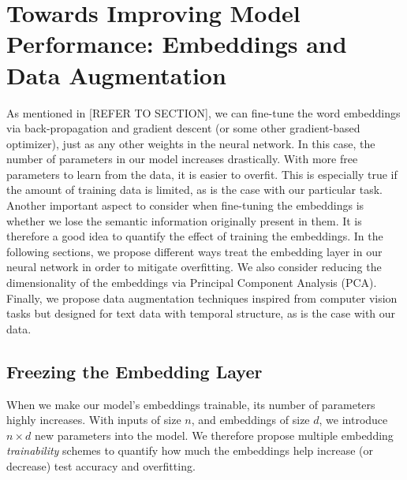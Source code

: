 
\chapter{Towards Improving Model Performance: Embeddings and Data Augmentation}
As mentioned in [REFER TO SECTION], we can fine-tune the word embeddings via back-propagation and gradient descent (or some other
gradient-based optimizer), just as any other weights in the neural network. In this case, the number of parameters in our model increases drastically.
With more free parameters to learn from the data, it is easier to overfit. This is especially true if the amount of training data is limited, as is the case
with our particular task. Another important aspect to consider when fine-tuning the embeddings is whether we lose the semantic information originally
present in them. It is therefore a good idea to quantify the effect of training the embeddings. In the following sections, we propose different ways
treat the embedding layer in our neural network in order to mitigate overfitting. We also consider reducing the dimensionality of the embeddings
via Principal Component Analysis (PCA). Finally, we propose data augmentation techniques inspired from computer vision tasks but designed for
text data with temporal structure, as is the case with our data.

\section{Freezing the Embedding Layer}
When we make our model's embeddings trainable, its number of parameters highly increases. With inputs of size $n$,
and embeddings of size $d$, we introduce $n \times d$ new parameters into the model.
We therefore propose multiple embedding \textit{trainability} schemes to quantify how much the embeddings help increase (or decrease) test
accuracy and overfitting.

